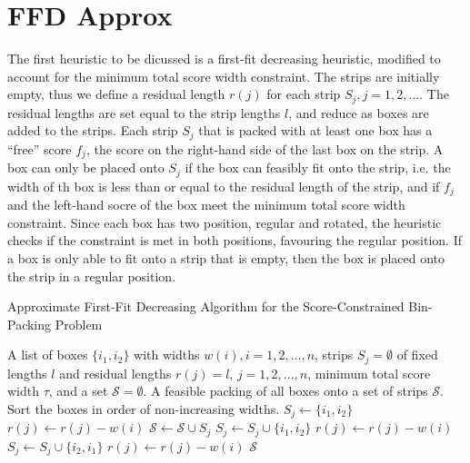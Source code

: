 \documentclass[oribibl]{llncs}
\begin{document}
\section{FFD Approx}

The first heuristic to be dicussed is a first-fit decreasing heuristic, modified to account for the minimum total score width constraint. The strips are initially empty, thus we define a residual length $r(j)$ for each strip $S_j, j = 1, 2, ...$. The residual lengths are set equal to the strip lengths $l$, and reduce as boxes are added to the strips. Each strip $S_j$ that is packed with at least one box has a ``free'' score $f_j$, the score on the right-hand side of the last box on the strip. A box can only be placed onto $S_j$ if the box can feasibly fit onto the strip, i.e. the width of th box is less than or equal to the residual length of the strip, and if $f_j$ and the left-hand socre of the box meet the minimum total score width constraint. Since each box has two position, regular and rotated, the heuristic checks if the constraint is met in both positions, favouring the regular position. If a box is only able to fit onto a strip that is empty, then the box is placed onto the strip in a regular position.








\begin{algorithm}[H]
	\caption{\textcolor{OliveGreen}{Approximate First-Fit Decreasing Algorithm for the Score-Constrained Bin-Packing Problem}}
	\begin{algorithmic}[1]
	\Require A list of boxes $\{i_1, i_2\}$ with widths $w(i), i = 1, 2, ..., n$, strips $S_j = \emptyset$ of fixed lengths $l$ and residual lengths $r(j) = l$, $j = 1, 2, ...,n$, minimum total score width $\tau$, and a set $\mathcal{S} = \emptyset$.
	\Ensure A feasible packing of all boxes onto a set of strips $\mathcal{S}$.
	\State Sort the boxes in order of non-increasing widths.
				\State $S_j \gets \{i_1, i_2\}$
				\State $r(j) \gets r(j) - w(i)$
				\State $\mathcal{S} \gets \mathcal{S} \cup S_j$
				\Break
					\State $S_j \gets S_j \cup \{i_1, i_2\}$
					\State $r(j) \gets r(j) - w(i)$
					\Break
					\State $S_j \gets S_j \cup \{i_2, i_1\}$
					\State $r(j) \gets r(j) - w(i)$
					\Break
				\EndIf
			\EndIf
		\EndFor
	\EndFor
	\Return $\mathcal{S}$
	\end{algorithmic}	
\end{algorithm}
\end{document}
